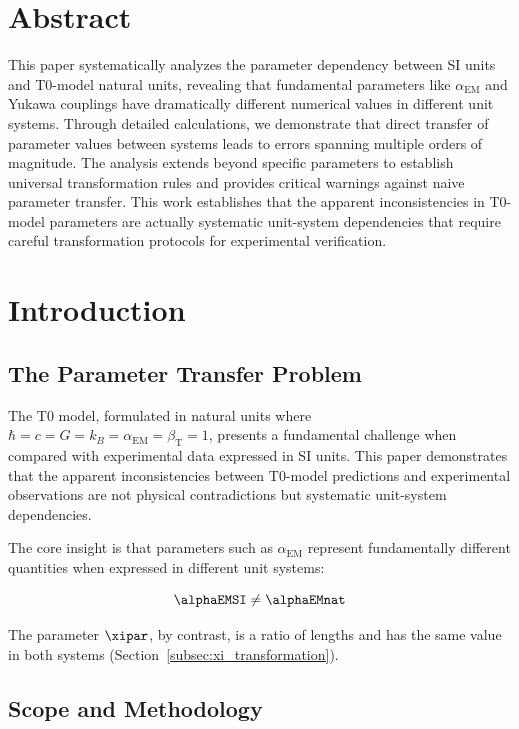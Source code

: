 \section*{Abstract}
		This paper systematically analyzes the parameter dependency between SI units and T0-model natural units, revealing that fundamental parameters like $\alpha_{\text{EM}}$ and Yukawa couplings have dramatically different numerical values in different unit systems. Through detailed calculations, we demonstrate that direct transfer of parameter values between systems leads to errors spanning multiple orders of magnitude. The analysis extends beyond specific parameters to establish universal transformation rules and provides critical warnings against naive parameter transfer. This work establishes that the apparent inconsistencies in T0-model parameters are actually systematic unit-system dependencies that require careful transformation protocols for experimental verification.

	

	\section{Introduction}
	\label{sec:introduction}
	
	\subsection{The Parameter Transfer Problem}
	\label{subsec:parameter_problem}
	
	The T0 model, formulated in natural units where $\hbar = c = G = k_B = \alpha_{\text{EM}} = \beta_{\text{T}} = 1$, presents a fundamental challenge when compared with experimental data expressed in SI units. This paper demonstrates that the apparent inconsistencies between T0-model predictions and experimental observations are not physical contradictions but systematic unit-system dependencies.
	
	The core insight is that parameters such as $\alpha_{\text{EM}}$ represent fundamentally different quantities when expressed in different unit systems:
	
	$$\alphaEMSI \neq \alphaEMnat$$
	
	The parameter $\xipar$, by contrast, is a ratio of lengths and has the same value in both systems (Section~\ref{subsec:xi_transformation}).
	
	\subsection{Scope and Methodology}
	\label{subsec:scope}
	
